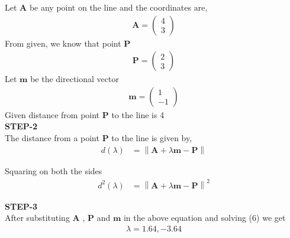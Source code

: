 \documentclass[10pt,a4paper]{report}
\newcommand{\myvec}[1]{\ensuremath{\begin{pmatrix}#1\end{pmatrix}}}
\let\vec\mathbf
\providecommand{\norm}[1]{\left\lVert#1\right\rVert}
\let\vec\mathbf
\providecommand{\brak}[1]{\ensuremath{\left(#1\right)}}
\begin{document}
\begin{multicols}{2}
Let $\vec{A}$ be any point on the line and the coordinates are,\vspace{1mm}
\begin{align}
    \vec{A}=\myvec{
    4\\
    3
    } 
\end{align}
 \vspace{2mm}
From given, we know that point $\vec{P}$ \\
\begin{align}
    \vec{P}=\myvec{
    2\\
    3
    } 
\end{align} \vspace{2mm}
Let $\vec{m}$ be the directional vector \\\vspace{1mm}
\begin{align}
    \vec{m}=\myvec{
    1\\
    -1
    } 
\end{align}
Given distance from point $\vec{P}$ to the line is 4\\
\vspace{5mm}
\textbf{STEP-2}\vspace{2mm}\\
The distance from a point  $\vec{P}$ to the line is given by, \\ \vspace{1mm}
\begin{align}
	\label{dist_3d_def}
	d\brak{\lambda } &=\norm{\vec{A} + \lambda \vec{m}-\vec{P}}
\end{align}
 \vspace{1mm}

Squaring on both the sides \\ \vspace{2mm}
\begin{align}
 	d^2\brak{\lambda } &=\norm{\vec{A} + \lambda \vec{m}-\vec{P}}^2
\end{align}
\vspace{2mm}

\textbf{STEP-3}\vspace{2mm}\\
After substituting $\vec{A}$ , $\vec{P}$ and $\vec{m}$ in the above equation and solving (6) we get 
\begin{align}
{\lambda }=1.64, -3.64
\end{align}


\end{multicols}
\end{document}
